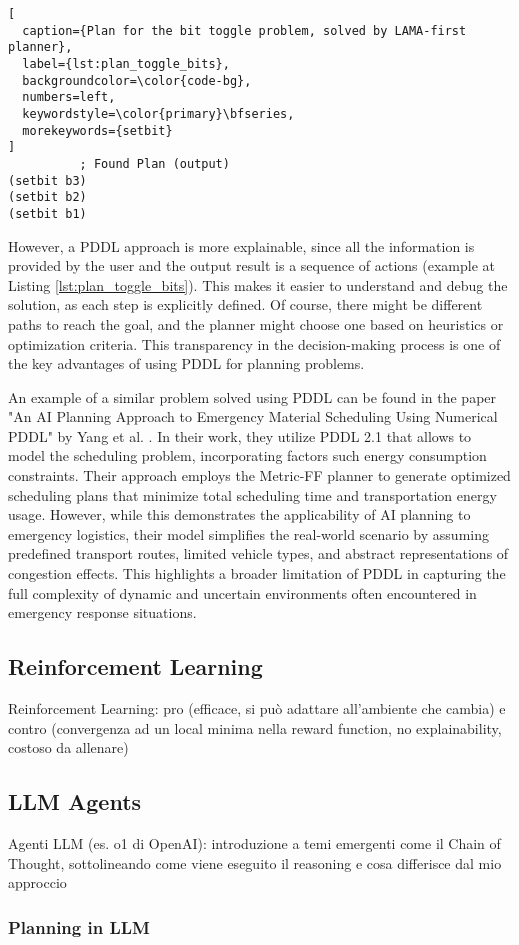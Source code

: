 \begin{lstlisting}[
  caption={Plan for the bit toggle problem, solved by LAMA-first planner},
  label={lst:plan_toggle_bits},
  backgroundcolor=\color{code-bg},
  numbers=left,
  keywordstyle=\color{primary}\bfseries,
  morekeywords={setbit}
]
          ; Found Plan (output)
(setbit b3)
(setbit b2)
(setbit b1)
\end{lstlisting}

However, a PDDL approach is more explainable, since all the information is provided
by the user and the output result is a sequence of actions (example at Listing
\ref{lst:plan_toggle_bits}). This makes it easier to understand and debug the
solution, as each step is explicitly defined. Of course, there might be different
paths to reach the goal, and the planner might choose one based on heuristics or
optimization criteria. This transparency in the decision-making process is one of
the key advantages of using PDDL for planning problems.

An example of a similar problem solved using PDDL can be found in the paper "An
AI Planning Approach to Emergency Material Scheduling Using Numerical PDDL" by Yang
et al. \cite{Yang2022}. In their work, they utilize PDDL 2.1 that allows to
model the scheduling problem, incorporating factors such energy consumption constraints.
Their approach employs the Metric-FF planner to generate optimized scheduling
plans that minimize total scheduling time and transportation energy usage. However,
while this demonstrates the applicability of AI planning to emergency logistics,
their model simplifies the real-world scenario by assuming predefined transport routes,
limited vehicle types, and abstract representations of congestion effects. This
highlights a broader limitation of PDDL in capturing the full complexity of
dynamic and uncertain environments often encountered in emergency response
situations.

\subsection{Reinforcement Learning}
Reinforcement Learning: pro (efficace, si può adattare all'ambiente che cambia)
e contro (convergenza ad un local minima nella reward function, no
explainability, costoso da allenare)

\subsection{LLM Agents}
Agenti LLM (es. o1 di OpenAI): introduzione a temi emergenti come il Chain of Thought,
sottolineando come viene eseguito il reasoning e cosa differisce dal mio
approccio

\subsubsection{Planning in LLM}